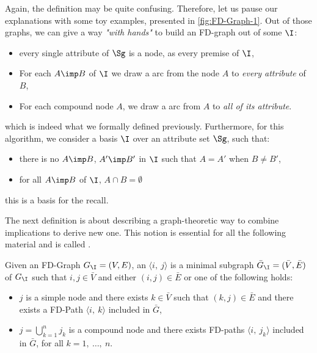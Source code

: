 Again, the definition may be quite confusing. Therefore, let us pause our 
explanations with some toy examples, presented in \ref{fig:FD-Graph-1}. 
Out of those graphs, we can give a way \textit{"with hands"}
to build an FD-graph out of some $\I$:
\begin{itemize}
	\item every single attribute of $\Sg$ is a node, as every premise of $\I$,
	\item For each $A \imp B$ of $\I$ we draw a  arc from the node
	$A$ to \textit{every attribute} of $B$,
	\item For each compound node $A$, we draw a  arc from
	$A$ to \textit{all of its attribute}.
\end{itemize}
\noindent which is indeed what we formally defined previously. Furthermore, for
this algorithm, we consider a basis $\I$ over an attribute set $\Sg$, such that:
\begin{itemize}
	\item there is no $A \imp B$, $A' \imp B'$ in $\I$ such that $A = A'$ when
	$B \neq B'$,
	\item for all $A \imp B$ of $\I$, $A \cap B = \emptyset$
\end{itemize}
\noindent this is a  basis for the recall.

\begin{center}
	
\end{center}

\vspace{1.2em}

The next definition is about describing a graph-theoretic way to combine 
implications to derive new one. This notion is essential for all the following 
material and is called .

\begin{definition} Given an FD-Graph $G_{\I} = (V, E)$, an
 $\langle i, \ j \rangle$ is a minimal subgraph 
$\bar{G}_{\I} = (\bar{V}, \bar{E})$ of $G_{\I}$ such that $i, j \in \bar{V}$ 
and either $(i, j) \in \bar{E}$ or one of the following holds:
\begin{itemize}
	\item $j$ is a simple node and there exists $k \in \bar{V}$ such that 
	$(k, j) \in \bar{E}$ and there exists a FD-Path $\langle i, \ k \rangle$ 
	included in $\bar{G}$, 
	 
	\item $j = \bigcup_{k = 1}^n j_k$ is a compound node and there exists 
	FD-paths $\langle i, \ j_k \rangle$ included in $\bar{G}$, for all $k = 
	1, \ \dots, \ n$.
\end{itemize}
	
\end{definition}

